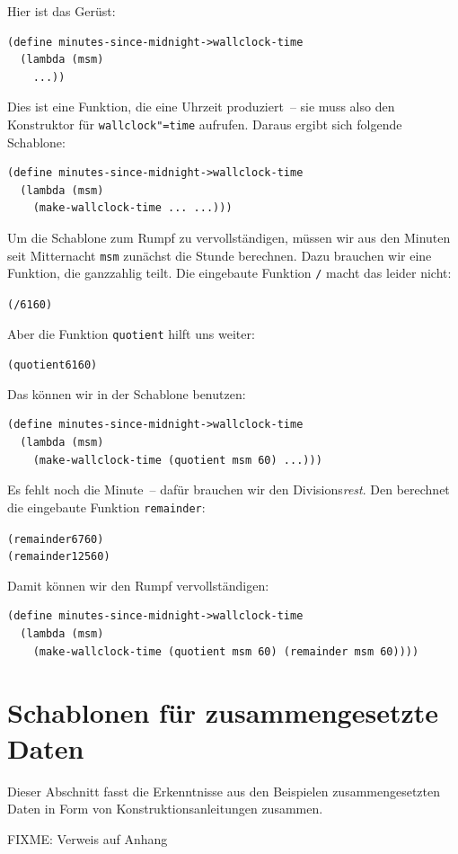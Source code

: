 %
Hier ist das Gerüst:
%
\begin{verbatim}
(define minutes-since-midnight->wallclock-time
  (lambda (msm)
    ...))
\end{verbatim}
%
Dies ist eine Funktion, die eine Uhrzeit produziert~-- sie muss also
den Konstruktor für \texttt{wallclock"=time} aufrufen.  Daraus ergibt
sich folgende Schablone:
%
\begin{verbatim}
(define minutes-since-midnight->wallclock-time
  (lambda (msm)
    (make-wallclock-time ... ...)))
\end{verbatim}
% 
Um die Schablone zum Rumpf zu vervollständigen, müssen wir aus den
Minuten seit Mitternacht \texttt{msm} zunächst die Stunde berechnen.
Dazu brauchen wir eine Funktion, die ganzzahlig teilt.  Die eingebaute
Funktion \texttt{/} macht das leider nicht:
%
\begin{alltt}
(/ 61 60)
\end{alltt}
%
Aber die Funktion \texttt{quotient} hilft uns weiter:
%
\begin{alltt}
(quotient 61 60)
\end{alltt}
%
Das können wir in der Schablone benutzen:
%
\begin{verbatim}
(define minutes-since-midnight->wallclock-time
  (lambda (msm)
    (make-wallclock-time (quotient msm 60) ...)))
\end{verbatim}
%
Es fehlt noch die Minute~-- dafür brauchen wir den
Divisions\emph{rest}.  Den berechnet die eingebaute Funktion
\texttt{remainder}:
%
\begin{alltt}
(remainder 67 60)
(remainder 125 60)
\end{alltt}
%
Damit können wir den Rumpf vervollständigen:
%
\begin{verbatim}
(define minutes-since-midnight->wallclock-time
  (lambda (msm)
    (make-wallclock-time (quotient msm 60) (remainder msm 60))))
\end{verbatim}

\section{Schablonen für  zusammengesetzte Daten}

Dieser Abschnitt fasst die Erkenntnisse aus den Beispielen
zusammengesetzten Daten in Form von Konstruktionsanleitungen zusammen.

FIXME: Verweis auf Anhang

